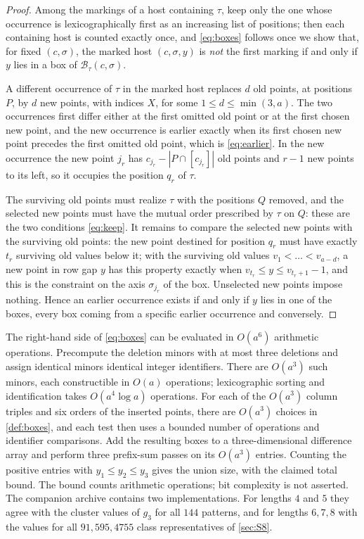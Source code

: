 \documentclass[11pt,reqno]{amsart}
\theoremstyle{plain}
\theoremstyle{definition}
\theoremstyle{remark}
\begin{document}
\begin{proof}
Among the markings of a host containing $\tau$, keep only the one whose occurrence is lexicographically first as an increasing list of positions; then each containing host is counted exactly once, and \eqref{eq:boxes} follows once we show that, for fixed $(c,\sigma)$, the marked host $(c,\sigma,y)$ is \emph{not} the first marking if and only if $y$ lies in a box of $\mathcal B_\tau(c,\sigma)$.

A different occurrence of $\tau$ in the marked host replaces $d$ old points, at positions $P$, by $d$ new points, with indices $X$, for some $1\le d\le\min(3,a)$. The two occurrences first differ either at the first omitted old point or at the first chosen new point, and the new occurrence is earlier exactly when its first chosen new point precedes the first omitted old point, which is \eqref{eq:earlier}. In the new occurrence the new point $j_r$ has $c_{j_r}-|P\cap[c_{j_r}]|$ old points and $r-1$ new points to its left, so it occupies the position $q_r$ of $\tau$. 

The surviving old points must realize $\tau$ with the positions $Q$ removed, and the selected new points must have the mutual order prescribed by $\tau$ on $Q$: these are the two conditions \eqref{eq:keep}. It remains to compare the selected new points with the surviving old points: the new point destined for position $q_r$ must have exactly $t_r$ surviving old values below it; with the surviving old values $v_1<\dots<v_{a-d}$, a new point in row gap $y$ has this property exactly when $v_{t_r}\le y\le v_{t_r+1}-1$, and this is the constraint on the axis $\sigma_{j_r}$ of the box. Unselected new points impose nothing. Hence an earlier occurrence exists if and only if $y$ lies in one of the boxes, every box coming from a specific earlier occurrence and conversely.
\end{proof}

The right-hand side of \eqref{eq:boxes} can be evaluated in $O(a^6)$
arithmetic operations. Precompute the deletion minors with at most three
deletions and assign identical minors identical integer identifiers.
There are $O(a^3)$ such minors, each constructible in $O(a)$ operations;
lexicographic sorting and identification takes $O(a^4\log a)$ operations.
For each of the $O(a^3)$ column triples and six orders of the inserted
points, there are $O(a^3)$ choices in \cref{def:boxes}, and each test
then uses a bounded number of operations and identifier comparisons.
Add the resulting boxes to a three-dimensional difference array and
perform three prefix-sum passes on its $O(a^3)$ entries. Counting the
positive entries with $y_1\le y_2\le y_3$ gives the union size, with
the claimed total bound. The bound counts arithmetic operations; bit complexity is not asserted.
The companion archive contains two implementations. For lengths $4$
and $5$ they agree with the cluster values of $g_3$ for all $144$ patterns,
and for lengths $6,7,8$ with the values for all $91,595,4755$ class
representatives of \cref{sec:S8}.
\end{document}
